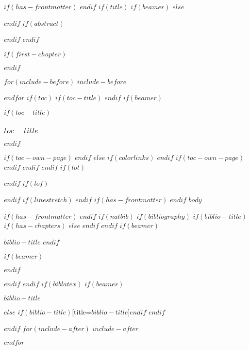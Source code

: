 \documentclass[
$if(fontsize)$
  $fontsize$,
$endif$
$if(lang)$
  $babel-lang$,
$endif$
$if(papersize)$
  $papersize$paper,
$else$
  a4paper,
$endif$
$if(beamer)$
  ignorenonframetext,
  $if(handout)$
    handout,
  $endif$
  $if(aspectratio)$
    aspectratio=$aspectratio$,
  $endif$
$endif$
$for(classoption)$
  $classoption$$sep$,
$endfor$
captions=tableheading
]{$if(beamer)$$documentclass$$else$$if(book)$scrbook$else$scrartcl$endif$$endif$}
\newif\ifbibliography
\begin{document}

$if(has-frontmatter)$
  \frontmatter
$endif$
$if(title)$
  $if(beamer)$
    \frame{\titlepage}  
  $else$
    \maketitle
  $endif$
  $if(abstract)$
    \begin{abstract}
      $abstract$
    \end{abstract}
  $endif$
$endif$

$if(first-chapter)$
  \setcounter{chapter}{$first-chapter$}
  \addtocounter{chapter}{-1}
$endif$

$for(include-before)$
  $include-before$

$endfor$
$if(toc)$
  $if(toc-title)$
    \renewcommand*\contentsname{$toc-title$}
  $endif$
  $if(beamer)$
    \begin{frame}[allowframebreaks]
      $if(toc-title)$
      \frametitle{$toc-title$}
      $endif$
      \tableofcontents[hideallsubsections]
      \clearpage %
    \end{frame}
    $if(toc-own-page)$
      \newpage %
    $endif$
  $else$
    {
      $if(colorlinks)$
      \hypersetup{linkcolor=$if(toccolor)$$toccolor$$else$$endif$}
      $endif$
      \setcounter{tocdepth}{$if(toc-depth)$$toc-depth$$else$5$endif$}
      \tableofcontents
      \clearpage %
      $if(toc-own-page)$
      \newpage
      $endif$
    }
  $endif$
$endif$
$if(lot)$
  \listoftables
$endif$
$if(lof)$
  \listoffigures
$endif$
$if(linestretch)$
$endif$
$if(has-frontmatter)$
  \mainmatter
$endif$
$body$

$if(has-frontmatter)$
  \backmatter
$endif$
$if(natbib)$
  $if(bibliography)$
    $if(biblio-title)$
      $if(has-chapters)$
        \renewcommand\bibname{$biblio-title$}
      $else$
        \renewcommand\refname{$biblio-title$}
      $endif$
    $endif$
    $if(beamer)$
      \begin{frame}[allowframebreaks]{$biblio-title$}
      \bibliographytrue
    $endif$
    
    $if(beamer)$
      \end{frame}
    $endif$

  $endif$
$endif$
$if(biblatex)$
  $if(beamer)$
    \begin{frame}[allowframebreaks]{$biblio-title$}
      \bibliographytrue
      \printbibliography[heading=none]
    \end{frame}
  $else$
    \printbibliography$if(biblio-title)$[title=$biblio-title$]$endif$
  $endif$

$endif$
$for(include-after)$
  $include-after$

$endfor$
\end{document}
